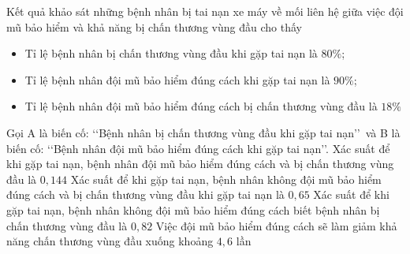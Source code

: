 \begin{ex}%
	Kết quả khảo sát những bệnh nhân bị tai nạn xe máy về mối liên hệ giữa việc đội mũ bảo hiểm và khả năng bị chấn thương vùng đầu cho thấy
	\begin{itemize}
		\item Tỉ lệ bệnh nhân bị chấn thương vùng đầu khi gặp tai nạn là $80 \%$;
		\item Tỉ lệ bệnh nhân đội mũ bảo hiểm đúng cách khi gặp tai nạn là $90 \%$;
		\item Tỉ lệ bệnh nhân đội mũ bảo hiểm đúng cách bị chấn thương vùng đầu là $18 \%$
	\end{itemize}
	Gọi A là biến cố: \lq\lq Bệnh nhân bị chấn thương vùng đầu khi gặp tai nạn\rq\rq\, và B là biến cố: \lq\lq Bệnh nhân đội mũ bảo hiểm đúng cách khi gặp tai nạn\rq\rq.
	\choiceTF
	{\True Xác suất để khi gặp tai nạn, bệnh nhân đội mũ bảo hiểm đúng cách và bị chấn thương vùng đầu là $0{,}144$}
	{Xác suất để khi gặp tai nạn, bệnh nhân không đội mũ bảo hiểm đúng cách và bị chấn thương vùng đầu khi gặp tai nạn là $0{,}65$}
	{\True Xác suất để khi gặp tai nạn, bệnh nhân không đội mũ bảo hiểm đúng cách biết bệnh nhân bị chấn thương vùng đầu là $0{,}82$}
	{\True Việc đội mũ bảo hiểm đúng cách sẽ làm giảm khả năng chấn thương vùng đầu xuống khoảng $4{,}6$ lần}
\end{ex}

